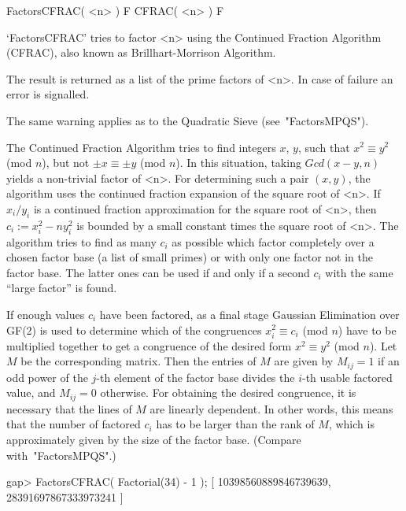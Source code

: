 
\>FactorsCFRAC( <n> ) F
\>CFRAC( <n> ) F

`FactorsCFRAC' tries to factor <n> using the Continued Fraction
Algorithm (CFRAC), also known as Brillhart-Morrison Algorithm.

The result is returned as a list of the prime factors of <n>.
In case of failure an error is signalled.

The same warning applies as to the Quadratic Sieve (see~"FactorsMPQS").

The Continued Fraction Algorithm tries to find integers $x$, $y$,
such that $x^2 \equiv y^2$ (mod $n$), but not $\pm x \equiv \pm y$
(mod $n$). In this situation, taking $Gcd(x - y,n)$ yields a 
non-trivial factor of <n>. For determining such a pair $(x,y)$, 
the algorithm uses the continued fraction expansion of the square root
of <n>.
If $x_i/y_i$ is a
continued fraction approximation for the square root of <n>,
then $c_i := x_i^2 - ny_i^2$ is bounded by a small constant times
the square root of <n>.
The algorithm tries to find as many $c_i$ as possible which factor 
completely over a chosen
factor base 
(a list of small primes) or with only one factor not in the factor base.
The latter ones can be used if and only if a second $c_i$ with the same
``large factor'' is found.

If enough values $c_i$ have been factored, as a final stage
Gaussian Elimination over GF(2)
is used to determine which of the congruences $x_i^2 \equiv c_i$
(mod $n$) have to be multiplied together to get a congruence
of the desired form  $x^2 \equiv y^2$ (mod $n$).
Let $M$ be the corresponding matrix. Then the entries of $M$ are given
by $M_{ij} = 1$ if an odd power of the $j$-th element of the factor
base divides the $i$-th usable factored value, and $M_{ij} = 0$
otherwise.
For obtaining the desired congruence, it is necessary that
the lines of $M$ are linearly dependent.
In other words, this means that the number of factored $c_i$ has to be
larger than the rank of $M$, which is approximately given by
the size of the factor base.
(Compare with~"FactorsMPQS".)

\beginexample
gap> FactorsCFRAC( Factorial(34) - 1 );
[ 10398560889846739639, 28391697867333973241 ]
\endexample


